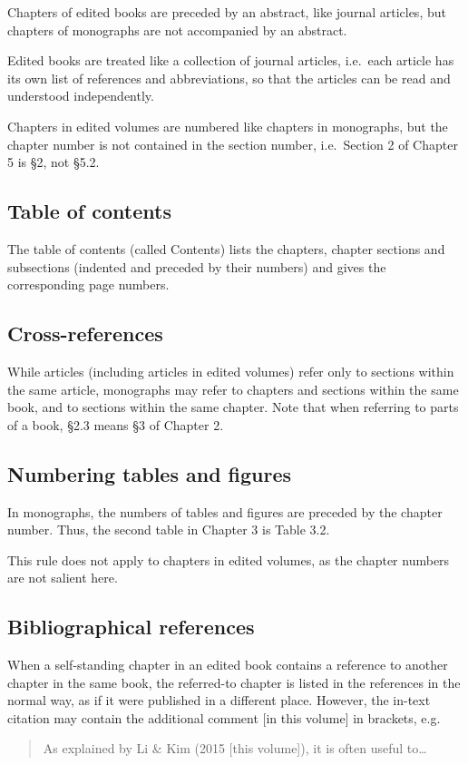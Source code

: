 \documentclass[a4paper]{article}
\newenvironment{gsrexq}{\begin{quote}\color{blue}}{\end{quote}}
\newcommand{\gsrex}[1]{{\color{blue}#1}}
\begin{document}
Chapters of edited books are preceded by an abstract, like journal
articles, but chapters of monographs are not accompanied by an abstract.

Edited books are treated like a collection of journal articles,
i.e.~each article has its own list of references and abbreviations, so
that the articles can be read and understood independently.

Chapters in
edited volumes are numbered like chapters in monographs, but the chapter
number is not contained in the section number, i.e.~Section 2 of Chapter
5 is §2, not §5.2.

\subsection{Table of contents}\label{sec:table-of-contents}

The table of contents (called \gsrex{Contents}) lists the chapters, chapter
sections and subsections (indented and preceded by their numbers) and
gives the corresponding page numbers.

\subsection{Cross-references}\label{sec:cross-references}

While articles (including articles in edited volumes) refer only to
sections within the same article, monographs may refer to chapters and
sections within the same book, and to sections within the same chapter.
Note that when referring to parts of a book, \gsrex{§2.3} means §3 of Chapter 2.

\subsection{Numbering tables and figures}\label{sec:numbering-tables-and-figures}

In monographs, the numbers of tables and figures are preceded by the
chapter number. Thus, the second table in Chapter 3 is \gsrex{Table 3.2}.

This rule does not apply to chapters in edited volumes, as the chapter
numbers are not salient here.

\subsection{Bibliographical references}\label{sec:bibliographical-references}
\enlargethispage{1\baselineskip}
When a self-standing chapter in an edited book contains a reference to
another chapter in the same book, the referred-to chapter is listed in
the references in the normal way, as if it were published in a different
place. However, the in-text citation may contain the additional comment
\gsrex{[in this volume]} in brackets, e.g.

\begin{gsrexq}
As explained by Li \& Kim (2015 [this volume]), it is often useful to\ldots{} 
\end{gsrexq}
\end{document}
